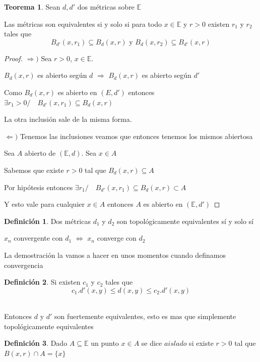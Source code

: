 \documentclass[12pt]{article}
\newcommand{\E}{\mathbb{E}}
\newcommand{\Ra}{\Rightarrow}
\theoremstyle{definition}
\newtheorem{definition}{Definición}[section]
\newtheorem{theorem}{Teorema}
\begin{document}
\begin{theorem}
  Sean $d, d'$ dos métricas sobre $\E$

\noindent  Las métricas son equivalentes si y solo si para todo $x \in \E$ y $r>0$ existen $r_{1}$ y $r_{2}$ tales que 
$$ B_{d'}(x,r_{1}) \subseteq B_{d}(x,r) \text{ y } B_{d}(x,r_{2}) \subseteq B_{d'}(x,r)$$

\begin{proof}
$\Ra ) $ Sea $r>0$, $x \in \E$.

  $B_{d}(x,r)$ es abierto según $d$ $\Ra$ $B_{d}(x,r)$ es abierto según $d'$

  Como $B_{d}(x,r)$ es abierto en $(E,d')$ entonces $ \exists r_{1} > 0 / \quad B_{d'}(x,r_{1}) \subseteq B_{d}(x,r)$

  La otra inclusión sale de la misma forma.

$\Leftarrow )$ Tenemos las inclusiones veamos que entonces tenemos los mismos abiertosa

Sea $A$ abierto de $(\E,d)$. Sea $x \in A$ 

Sabemos que existe $r > 0 $ tal que  $B_{d}(x,r) \subseteq A$

Por hipótesis entonces $\exists r_{1} / \quad B_{d'}(x,r_{1}) \subseteq B_{d}(x,r) \subset A$

Y esto vale para cualquier $x \in A$ entonces $A$ es abierto en $(\E,d')$
\end{proof}
\end{theorem}

\begin{definition}
 Dos métricas $d_1$ y $d_2$ son topológicamente equivalentes sí y solo sí 

 $x_n$ convergente con $d_1$ $\iff$ $x_n$ converge con $d_2$

 La demostración la vamos a hacer en unos momentos cuando definamos convergencia
\end{definition}

\begin{definition}
  Si existen $c_{1}$ y $c_{2}$ tales que 
  $$ c_{1}.d'(x,y) \leq d(x,y) \leq c_{2}.d'(x,y)$$\

  Entonces $d$ y $d'$ son fuertemente equivalentes, esto es mas que simplemente topológicamente equivalentes
 
\end{definition}

\begin{definition}
  Dado $A \subseteq \E$ un punto $x \in A$ se dice $aislado$ si existe $r>0$ tal que $B(x,r) \cap A = \{x\}$
\end{definition}
\end{document}
